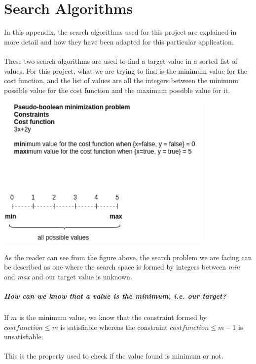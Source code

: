 
\chapter{Search Algorithms} %

\label{AppendixB} %

In this appendix, the search algorithms used for this project are explained in more detail and how they have been adapted for this particular application.\\\\
These two search algorithms are used to find a target value in a sorted list of values. For this project, what we are trying to find is the minimum value for the cost function, and the list of values are all the integers between the minimum possible value for the cost function and the maximum possible value for it.

\begin{center}
	\includegraphics[width=0.8\textwidth]{Figures/Search_space.png}
	\label{search_space}
\end{center}
As the reader can see from the figure above, the search problem we are facing can be described as one where the search space is formed by integers between \emph{min} and \emph{max} and our target value is unknown.

\paragraph{How can we know that a value is the minimum, i.e. our target?\\}
If $m$ is the minimum value, we know that the constraint formed by $cost function \leq m$ is satisfiable whereas the constraint $cost function \leq m-1$ is unsatisfiable.\\\\
This is the property used to check if the value found is minimum or not.


